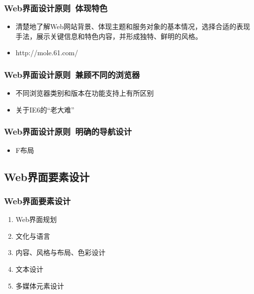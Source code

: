 \documentclass{beamer}
\newcommand{\fullPageImage}[2]{
	{
		\usebackgroundtemplate{\texttt{[image: \#1]}}
		\frame[plain]{#2}
	}
}
\begin{document}
\begin{frame}
	\frametitle{Web界面设计原则~{\small 体现特色}}
	\beamertemplatetransparentcovereddynamicmedium
	\begin{itemize}
		\item 清楚地了解Web网站背景、体现主题和服务对象的基本情况，选择合适的表现手法，展示关键信息和特色内容，并形成独特、鲜明的风格。
		\pause
		\item http://mole.61.com/
	\end{itemize}
\end{frame}

\begin{frame}
	\frametitle{Web界面设计原则~{\small 兼顾不同的浏览器}}
	\beamertemplatetransparentcovereddynamicmedium
	\begin{itemize}
		\item 不同浏览器类别和版本在功能支持上有所区别
		\pause
		\item 关于IE6的“老大难”
	\end{itemize}
\end{frame}

\begin{frame}
	\frametitle{Web界面设计原则~{\small 明确的导航设计}}
	\beamertemplatetransparentcovereddynamicmedium
	\begin{itemize}[<+->]
		\item F布局
	\end{itemize}
\end{frame}

\fullPageImage{images/heatmap.jpg}{}
\fullPageImage{images/f-wireframe.jpg}{}
\fullPageImage{images/f-pattern-2.jpg}{}

\subsection{Web界面要素设计}
\begin{frame}
	\frametitle{Web界面要素设计}
	\beamertemplatetransparentcovereddynamicmedium
	\begin{enumerate}[<+->]
		\item Web界面规划
		\item 文化与语言
		\item 内容、风格与布局、色彩设计
		\item 文本设计
		\item 多媒体元素设计
	\end{enumerate}
\end{frame}
\end{document}
